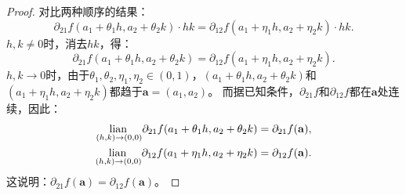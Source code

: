 \documentclass[12pt,UTF8]{ctexbook}
\begin{document}
\begin{appendix}
\begin{proof}
对比两种顺序的结果：
$$ \partial_{21} f(a_1 + \theta_1 h, a_2 + \theta_2 k) \cdot h k = \partial_{12} f(a_1 + \eta_1 h, a_2 + \eta_2 k) \cdot h k. $$
$h, k \neq 0$时，消去$h k$，得：
$$ \partial_{21} f(a_1 + \theta_1 h, a_2 + \theta_2 k) = \partial_{12} f(a_1 + \eta_1 h, a_2 + \eta_2 k). $$
$h, k \to 0$时，由于$\theta_1, \theta_2, \eta_1, \eta_2 \in (0, 1)$，$(a_1 + \theta_1 h, a_2 + \theta_2 k)$和$(a_1 + \eta_1 h, a_2 + \eta_2 k)$都趋于$\mathbf{a}=(a_1, a_2)$。
而据已知条件，$\partial_{21} f$和$\partial_{12} f$都在$\mathbf{a}$处连续，因此：
\begin{align*}
\underset{(h,k)\to (0,0)}{\operatorname{lian}\,} \partial_{21} f(a_1 + \theta_1 h, a_2 + \theta_2 k) &= \partial_{21} f(\mathbf{a}), \\
\underset{(h,k)\to (0,0)}{\operatorname{lian}\,} \partial_{12} f(a_1 + \eta_1 h, a_2 + \eta_2 k) &= \partial_{12} f(\mathbf{a}).
\end{align*}
这说明：$\partial_{21} f(\mathbf{a}) = \partial_{12} f(\mathbf{a})$。
\end{proof}


\end{appendix}
\end{document}
